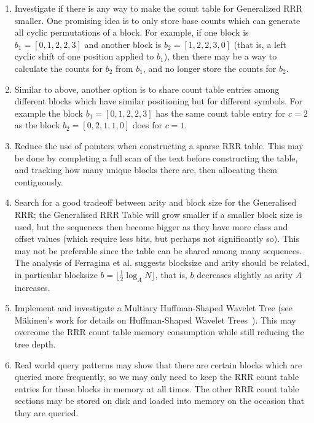 \begin{enumerate}
\item
	Investigate if there is any way to make the count table for Generalized RRR 
	smaller. One promising idea is to only store base counts which can
	generate all cyclic permutations of a block. For example, if one block is
	$b_1 = [0, 1, 2, 2, 3]$ and another block is $b_2 = [1, 2, 2, 3, 0]$ (that 
	is, a left cyclic shift of one position applied to $b_1$), then there may be
	a way to calculate the counts for $b_2$ from $b_1$, and no longer store the
	counts for $b_2$.
	
\item
	Similar to above, another option is to share count table entries among 
	different blocks which have similar positioning but for different symbols. 
	For example the block $b_1 = [0, 1, 2, 2, 3]$ has the same count table entry 
	for $c = 2$ as the block $b_2 = [0, 2, 1, 1, 0]$ does for $c = 1$.
	
\item
	Reduce the use of pointers when constructing a sparse RRR table. This may be
	done by completing a full scan of the text before constructing the table,
	and tracking how many unique blocks there are, then allocating them 
	contiguously.

\item
 	Search for a good tradeoff between arity and block size for the
	Generalised RRR; the Generalised RRR Table will grow smaller if a smaller 
	block size is used, but the sequences then become bigger as they have more
	class and offset values (which require less bits, but perhaps not 
	significantly so). This may not be preferable since the table can be shared 
	among many sequences. The analysis of Ferragina et al. \cite{ferragina2007}
	suggests blocksize and arity should be related, in particular blocksize
	$b = \lfloor \frac{1}{2} \log_{A} N \rfloor$, that is, $b$ decreases 
	slightly as arity $A$ increases.

\item
	Implement and investigate a Multiary Huffman-Shaped Wavelet Tree (see 
	M\"{a}kinen's work for details on Huffman-Shaped Wavelet
	Trees~\cite{makinen2005}). This may
	overcome the RRR count table memory consumption while still reducing the 
	tree depth.

\item
	Real world query patterns may show that there are certain blocks which are 
	queried more frequently, so we may only need to keep the RRR count table 
	entries
	for these blocks in memory at all times. The other RRR count table sections 
	may be stored on disk and loaded into memory on the occasion that they are 
	queried.


\end{enumerate}
